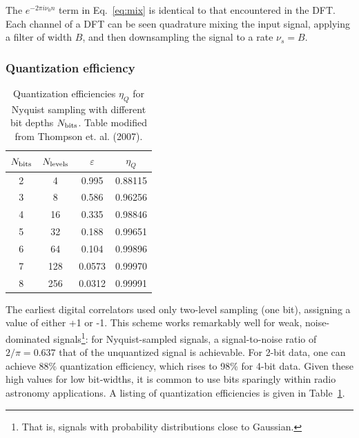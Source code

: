 \documentclass{ws-rv961x669}
\begin{document}
The $e^{-2\pi i \nu_0 n}$ term in Eq.~\ref{eq:mix} is identical to that encountered in the DFT. Each channel of a DFT can be seen quadrature mixing the input signal, applying a filter of width $B$, and then downsampling the signal to a rate $\nu_s=B$.


\subsubsection{Quantization efficiency \label{sub:quant}}

\begin{table}
	\caption{Quantization efficiencies $\eta_Q$ for Nyquist sampling with different bit depths $N_{\rm{bits}}$. Table modified from Thompson et. al. (2007)\citep{Thompson:2007p8886}.\label{tab:quant_eff}}
	\begin{center}
	\begin{tabular}{c c c c}
	\hline
	$N_{\rm{bits}}$ & $N_{\rm{levels}}$ & $\varepsilon$ & $\eta_Q$ \\
	\hline
	\hline
	2 & 4   & 0.995  & 0.88115 \\
	3 & 8   & 0.586  & 0.96256 \\
	4 & 16  & 0.335  & 0.98846 \\
	5 & 32  & 0.188  & 0.99651 \\
	6 & 64  & 0.104  & 0.99896 \\
	7 & 128 & 0.0573 & 0.99970 \\
	8 & 256 & 0.0312 & 0.99991 \\
	\hline
	\end{tabular}
	\end{center}
\end{table}

The earliest digital correlators \citep{Weinreb:1963p10042} used only two-level sampling (one bit), assigning a value of either +1 or -1. This scheme works remarkably well for weak, noise-dominated signals\footnote{That is, signals with probability distributions close to Gaussian.}: for Nyquist-sampled signals, a signal-to-noise ratio of $2/\pi=0.637$ that of the unquantized signal is achievable\citet{ThompsonMoranSwenson2004}. For 2-bit data, one can achieve 88\% quantization efficiency, which rises to 98\% for 4-bit data. Given these high values for low bit-widths, it is common to use bits sparingly within radio astronomy applications. A listing of quantization efficiencies\cite{Thompson:2007p8886} is given in Table~\ref{tab:quant_eff}.
\end{document}
